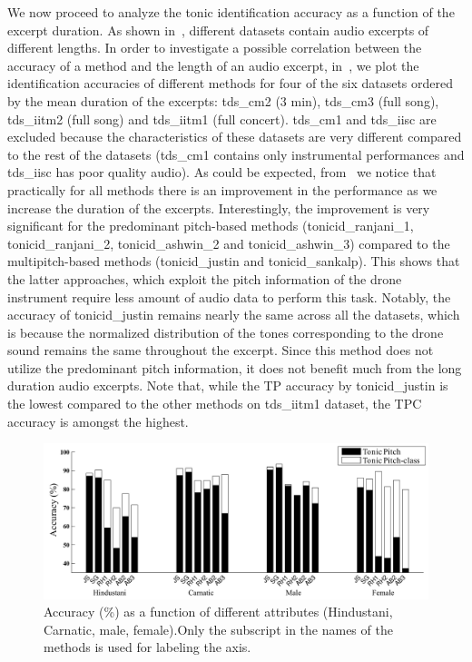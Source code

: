 {We now proceed to analyze the tonic identification accuracy as a function of the excerpt duration. As shown in~, different datasets contain audio excerpts of different lengths. In order to investigate a possible correlation between the accuracy of a method and the length of an audio
excerpt, in~, we plot the identification accuracies of different methods for four of the six datasets ordered
by the mean duration of the excerpts: \acrshort{tds_cm2} (3 min), \acrshort{tds_cm3} (full song), \acrshort{tds_iitm2} (full song) and \acrshort{tds_iitm1} (full concert). \acrshort{tds_cm1} and \acrshort{tds_iisc} are excluded because the characteristics of these datasets are very different compared to the rest of the datasets (\acrshort{tds_cm1} contains only instrumental performances and \acrshort{tds_iisc} has poor quality audio). As could be expected, from~ we notice that practically for all methods there is an improvement in the performance as we increase the duration
of the excerpts. Interestingly, the improvement is very significant for the predominant pitch-based methods (\acrshort{tonicid_ranjani_1}, \acrshort{tonicid_ranjani_2}, \acrshort{tonicid_ashwin_2} and \acrshort{tonicid_ashwin_3}) compared to the multipitch-based methods (\acrshort{tonicid_justin} and \acrshort{tonicid_sankalp}). This shows that the latter approaches, which exploit the pitch information of the drone instrument require less amount of audio data to perform this task. Notably, the accuracy of \acrshort{tonicid_justin} remains nearly the same across all the datasets, which is because the normalized distribution of the tones corresponding to the drone sound remains the same throughout the excerpt. Since this method does not utilize the predominant pitch information, it does not benefit much from the long duration audio excerpts. Note that, while the TP accuracy by \acrshort{tonicid_justin} is the lowest compared to the other methods on \acrshort{tds_iitm1} dataset, the TPC accuracy is amongst the highest. 

\begin{figure}
	\begin{center}
		\includegraphics[width=\figSizeHundred]{ch05_preprocessing/figures/Category_Performance.pdf}
	\end{center}
	\caption[Tonic identification accuracies for Hindustani, Carnatic, male and female excerpts]{Accuracy (\%) as a function of different attributes (Hindustani, Carnatic, male, female).Only the subscript in the names of the methods is used for labeling the axis.}
	\label{fig:tonic_id_categorywise_performance}
\end{figure}

}
